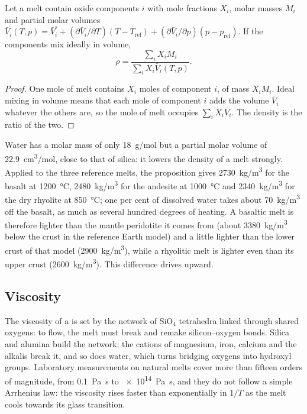 \begin{proposition}\label{prop:b2:magma-emplacement:density}
Let a melt contain oxide components $i$ with mole fractions $X_i$, molar masses
$M_i$ and partial molar volumes $\bar V_i(T, p) = \bar V_i^{\circ} + (\partial\bar
V_i/\partial T)(T - T_{\mathrm{ref}}) + (\partial\bar V_i/\partial p)(p - p_{\mathrm{ref}})$.
If the components mix ideally in volume,
\[
\rho = \frac{\sum_i X_i M_i}{\sum_i X_i \bar V_i(T,p)}.
\]
\end{proposition}

\begin{proof}
One mole of melt contains $X_i$ moles of component $i$, of mass $X_iM_i$. Ideal
mixing in volume means that each mole of component $i$ adds the volume $\bar V_i$
whatever the others are, so the mole of melt occupies $\sum_i X_i\bar V_i$. The
density is the ratio of the two.
\end{proof}

Water has a molar mass of only \qty{18}{g/mol} but a partial molar volume of
\qty{22.9}{cm^3/mol}, close to that of silica: it lowers the density of a melt
strongly. Applied to the three reference melts, the proposition gives
\qty{2730}{kg/m^3} for the basalt at \qty{1200}{\celsius}, \qty{2480}{kg/m^3} for
the andesite at \qty{1000}{\celsius} and \qty{2340}{kg/m^3} for the dry rhyolite
at \qty{850}{\celsius}; one per cent of dissolved water takes about
\qty{70}{kg/m^3} off the basalt, as much as several hundred degrees of heating.
A basaltic melt is therefore lighter than the mantle peridotite it comes from
(about \qty{3380}{kg/m^3} below the crust in the reference Earth model) and a
little lighter than the lower crust of that model (\qty{2900}{kg/m^3}), while a
rhyolitic melt is lighter even than its upper crust (\qty{2600}{kg/m^3}). This difference drives 
upward.

\subsection{Viscosity}

The viscosity of a  is set by the network of SiO$_4$ tetrahedra
linked through shared oxygens: to flow, the melt must break and remake
silicon--oxygen bonds. Silica and alumina build the network; the cations of
magnesium, iron, calcium and the alkalis break it, and so does water, which
turns bridging oxygens into hydroxyl groups. Laboratory measurements on natural
melts cover more than fifteen orders of magnitude, from \qty{0.1}{Pa.s} to
\qty{e14}{Pa.s}, and they do not follow a simple Arrhenius law: the viscosity
rises faster than exponentially in $1/T$ as the melt cools towards its glass
transition.

